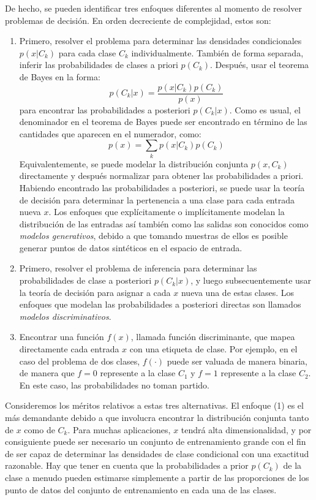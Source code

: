 	De hecho, se pueden identificar tres enfoques diferentes al momento de resolver problemas de decisión. En orden decreciente de complejidad, estos son:
		\begin{enumerate}
			\item Primero, resolver el problema para determinar las densidades condicionales $p(x \vert C_k)$ para cada clase $C_k$ individualmente. También de forma separada, inferir las probabilidades de clases a priori $p(C_k)$. Después, usar el teorema de Bayes en la forma:
			$$p(C_k \vert x) = \frac{p(x \vert C_k)p(C_k)}{p(x)} $$
			para encontrar las probabilidades a posteriori $p(C_k \vert x)$. Como es usual, el denominador en el teorema de Bayes puede ser encontrado en término de las cantidades que aparecen en el numerador, como:
			 $$p(x) = \sum_k p(x \vert C_k)p(C_k) $$
			Equivalentemente, se puede modelar la distribución conjunta $p(x,C_k)$ directamente y después normalizar para obtener las probabilidades a priori. Habiendo encontrado las probabilidades a posteriori, se puede usar la teoría de decisión para determinar la pertenencia a una clase para cada entrada nueva $x$. Los enfoques que explícitamente o implícitamente modelan la distribución de las entradas así también como las salidas son conocidos como \textit{modelos generativos}, debido a que tomando muestras de ellos es posible generar puntos de datos sintéticos en el espacio de entrada.
			\item Primero, resolver el problema de inferencia para determinar las  probabilidades de clase a posteriori $p(C_k \vert x)$, y luego subsecuentemente usar la teoría de decisión para asignar a cada $x$ nueva una de estas clases. Los enfoques que modelan las probabilidades a posteriori directas son llamados \textit{modelos discriminativos}.
			\item Encontrar una función $f(x)$, llamada función discriminante, que mapea directamente cada entrada $x$ con una etiqueta de clase. Por ejemplo, en el caso del problema de dos clases, $f(\cdot)$ puede ser valuada de manera binaria, de manera que $f = 0$ represente a la clase $C_1$ y $f = 1$ represente a la clase $C_2$. En este caso, las probabilidades no toman partido. 
		\end{enumerate}
		
	Consideremos los méritos relativos a estas tres alternativas. El enfoque (1) es el más demandante debido a que involucra encontrar la distribución conjunta tanto de $x$ como de $C_k$. Para muchas aplicaciones, $x$ tendrá alta dimensionalidad, y por consiguiente puede ser necesario un conjunto de entrenamiento grande con el fin de ser capaz de determinar las densidades de clase condicional con una exactitud razonable. Hay que tener en cuenta que la probabilidades a prior $p(C_k)$ de la clase a menudo pueden estimarse simplemente a partir de las proporciones de los punto de datos del conjunto de entrenamiento en cada una de las clases.
		
